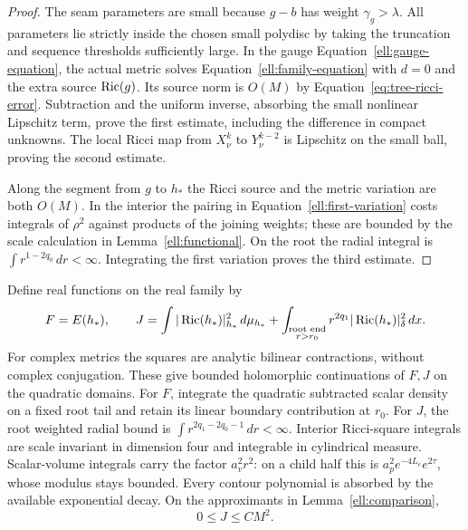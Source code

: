 \begin{proof}
The seam parameters are small because $g-b$ has weight
$\gamma_g>\lambda$.  All parameters lie strictly inside the
chosen small polydisc by taking the truncation and sequence
thresholds sufficiently large.  In the gauge
Equation~\eqref{ell:gauge-equation}, the actual metric solves
Equation~\eqref{ell:family-equation} with $d=0$ and the extra source
$\operatorname{Ric}(g)$.  Its source norm is $O(M)$ by
Equation~\eqref{eq:tree-ricci-error}.  Subtraction and the uniform
inverse, absorbing the small nonlinear Lipschitz term, prove the
first estimate, including the difference in compact unknowns.
The local Ricci map from $X^k_\nu$ to $Y^{k-2}_\nu$ is Lipschitz
on the small ball, proving the second estimate.

Along the segment from $g$ to $h_*$ the Ricci source and the
metric variation are both $O(M)$.  In the interior the pairing
in Equation~\eqref{ell:first-variation} costs integrals of
$\rho^2$ against products of the joining weights; these are
bounded by the scale calculation in Lemma~\ref{ell:functional}.
On the root the radial integral is
$\int r^{1-2q_0}\,dr<\infty$.  Integrating the first variation
proves the third estimate.
\end{proof}

Define real functions on the real family by
\begin{equation}
 F=E(h_*),\qquad
 J=\int|\operatorname{Ric}(h_*)|_{h_*}^2\,d\mu_{h_*}
 +\int_{\substack{\text{root end}\\r>r_0}}
       r^{2q_1}|\operatorname{Ric}(h_*)|_\delta^2\,dx.
 \label{ell:observables}
\end{equation}
For complex metrics the squares are analytic bilinear
contractions, without complex conjugation.  These give bounded
holomorphic continuations of $F,J$ on the quadratic domains.
For $F$, integrate the quadratic subtracted scalar density on a
fixed root tail and retain its linear boundary contribution at
$r_0$.  For $J$, the root weighted radial bound is
$\int r^{2q_1-2q_0-1}\,dr<\infty$.  Interior Ricci-square
integrals are scale invariant in dimension four and integrable
in cylindrical measure.  Scalar-volume integrals carry the factor
$a_v^2r^2$: on a child half this is
$a_p^2e^{-4L_e}e^{2\tau}$, whose modulus stays bounded.
Every contour polynomial is absorbed by the available exponential
decay.  On the approximants in Lemma~\ref{ell:comparison},
\begin{equation}
                  0\le J\le CM^2.
 \label{ell:J-small}
\end{equation}
